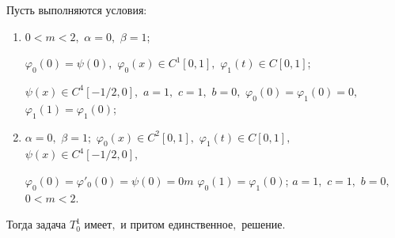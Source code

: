 \begin{theorem}[1]Пусть выполняются условия\/{\rm:}

\begin{enumerate}

\item[\rm 1)] $0<m<2,$ $\alpha=0,$ $\beta=1$\/{\rm;}

$\varphi_0(0)=\psi(0),$ $\varphi_0(x)\in C^1[0, 1],$ $\varphi_1(t)\in C[0, 1]$\/{\rm;} 

$\psi(x)\in C^4[-1/2, 0],$ $a=1,$ $c=1,$ $b=0,$ $\varphi_0(0)=\varphi_1(0)=0,$ $\varphi_1(1)=\varphi_1(0)$\/{\rm;}

\item[\rm 2)] $\alpha=0,$ $\beta=1;$ $\varphi_0(x)\in C^2[0, 1],$ $\varphi_1(t)\in C[0, 1],$ $\psi(x)\in C^4[-1/2, 0],$

$\varphi_0(0)=\varphi'_0(0)=\psi(0)=0m$ $\varphi_0(1)=\varphi_1(0)$\/{\rm;} $a=1,$ $c=1,$ $b=0,$ $0<m<2.$

\end{enumerate}

Тогда задача $T_0^1$ имеет$,$ и притом единственное$,$ решение\rm.

\end{theorem}



